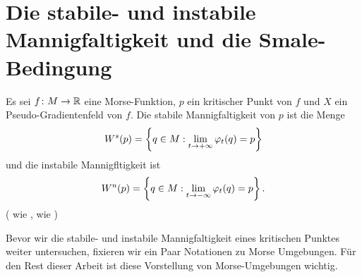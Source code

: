 \section{Die stabile- und instabile Mannigfaltigkeit und die Smale-Bedingung}

\begin{definition}
    \label{def: stabile und instabile mannigfaltigkeit}
    Es sei $f \colon M \to { \mathbb R }$ eine Morse-Funktion, $p$ ein kritischer Punkt von $f$ und $X$ ein
    Pseudo-Gradientenfeld von $f$. Die stabile Mannigfaltigkeit von $p$ ist die Menge
    \[ { W^s } (p) = \left\{ q \in M : \lim_{t \to + \infty} \varphi_t(q) = p \right\} \]
    und die instabile Mannigfltigkeit ist
    \[ { W^u } (p) = \left\{ q \in M : \lim_{t \to - \infty} \varphi_t(q) = p \right\} . \]
    ( wie ,  wie )
\end{definition}

Bevor wir die stabile- und instabile Mannigfaltigkeit eines kritischen Punktes weiter untersuchen, 
fixieren wir ein Paar Notationen zu Morse Umgebungen. Für den Rest dieser Arbeit ist diese 
Vorstellung von Morse-Umgebungen wichtig.


